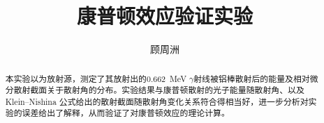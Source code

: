 \title{康普顿效应验证实验}

\author{顾周洲}

\begin{abstract}
    本实验以\csAtom 为放射源，测定了其放射出的\SI{0.662}{MeV} $\gamma$射线被铝棒散射后的能量及相对微分散射截面关于散射角的分布。实验结果与康普顿散射的光子能量随散射角、以及Klein–Nishina 公式给出的散射截面随散射角变化关系符合得相当好，进一步分析对实验的误差给出了解释，从而验证了对康普顿效应的理论计算。


\end{abstract}